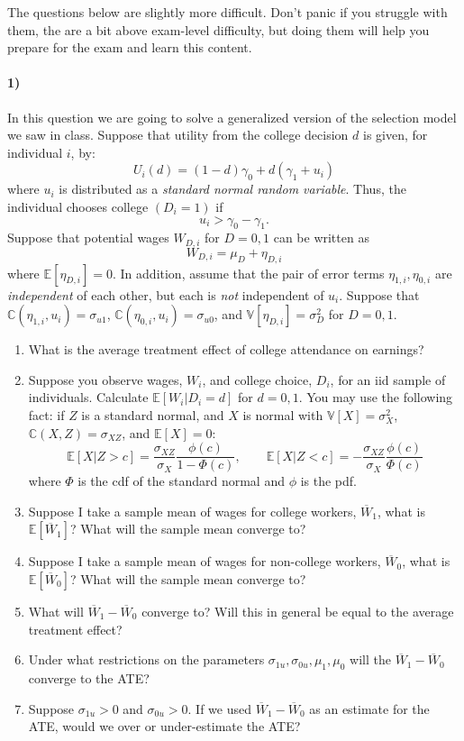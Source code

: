 \documentclass[12pt]{article}
\newcommand\ov{\overline}
\newcommand\BB{\mathbb}
\newcommand\EE{\mathbb{E}}
\numberwithin{equation}{section}
\numberwithin{figure}{section}
\numberwithin{table}{section}
\begin{document}
The questions below are slightly more difficult. Don't panic if you struggle with them, the are a bit above exam-level difficulty, but doing them will help you prepare for the exam and learn this content.

\paragraph{1)} In this question we are going to solve a generalized version of the selection model we saw in class. Suppose that utility from the college decision $d$ is given, for individual $i$, by:
\[U_i(d) = (1-d)\gamma_0 + d(\gamma_1 + u_i)\]
where $u_i$ is distributed as a \emph{standard normal random variable}. Thus, the individual chooses college $(D_i=1)$ if
\[u_i > \gamma_0-\gamma_1.\]
Suppose that potential wages $W_{D,i}$ for $D=0,1$ can be written as
\[ W_{D,i} = \mu_D + \eta_{D,i} \]
where $\EE[\eta_{D,i}]=0$. In addition, assume that the pair of error terms $\eta_{1,i},\eta_{0,i}$ are \emph{independent} of each other, but each is \emph{not} independent of $u_i$. Suppose that $\BB{C}(\eta_{1,i},u_i)=\sigma_{u1}$, $\BB{C}(\eta_{0,i},u_i)=\sigma_{u0}$, and $\BB{V}[\eta_{D,i}]=\sigma^2_D$ for $D=0,1$.

\begin{enumerate}
\item What is the average treatment effect of college attendance on earnings?
\item Suppose you observe wages, $W_i$, and college choice, $D_i$, for an iid sample of individuals. Calculate $\EE[W_i|D_i=d]$ for $d=0,1$. You may use the following fact: if $Z$ is a standard normal, and $X$ is normal with $\BB{V}[X]=\sigma^2_{X}$, $\BB{C}(X,Z)=\sigma_{XZ}$, and $\EE[X]=0$:
  \[\EE[X|Z>c] = \frac{\sigma_{XZ}}{\sigma_X}\frac{\phi(c)}{1-\Phi(c)},\qquad \EE[X|Z<c] = -\frac{\sigma_{XZ}}{\sigma_X}\frac{\phi(c)}{\Phi(c)} \]
  where $\Phi$ is the cdf of the standard normal and $\phi$ is the pdf.
\item Suppose I take a sample mean of wages for college workers, $\ov{W}_1$, what is $\EE[\ov{W}_1]$? What will the sample mean converge to?
\item Suppose I take a sample mean of wages for non-college workers, $\ov{W}_0$, what is $\EE[\ov{W}_0]$? What will the sample mean converge to?
\item What will $\ov{W}_1-\ov{W}_0$ converge to? Will this in general be equal to the average treatment effect?
\item Under what restrictions on the parameters $\sigma_{1u},\sigma_{0u},\mu_1,\mu_0$ will the $\ov{W}_1-\ov{W}_0$ converge to the ATE?
\item Suppose $\sigma_{1u}>0$ and $\sigma_{0u}>0$. If we used $\ov{W}_1-\ov{W}_0$ as an estimate for the ATE, would we over or under-estimate the ATE?
\end{enumerate}
\end{document}
